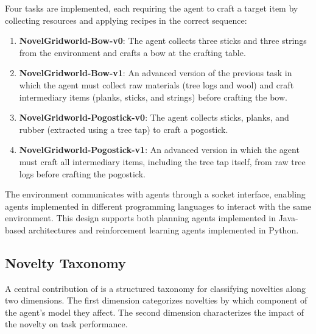 Four tasks are implemented, each requiring the agent to craft a target item by collecting resources and applying recipes in the correct sequence:
\begin{enumerate}[leftmargin=*]
    \item \textbf{NovelGridworld-Bow-v0}: The agent collects three sticks and three strings from the environment and crafts a bow at the crafting table.
    \item \textbf{NovelGridworld-Bow-v1}: An advanced version of the previous task in which the agent must collect raw materials (tree logs and wool) and craft intermediary items (planks, sticks, and strings) before crafting the bow.
    \item \textbf{NovelGridworld-Pogostick-v0}: The agent collects sticks, planks, and rubber (extracted using a tree tap) to craft a pogostick.
    \item \textbf{NovelGridworld-Pogostick-v1}: An advanced version in which the agent must craft all intermediary items, including the tree tap itself, from raw tree logs before crafting the pogostick.
\end{enumerate}




The environment communicates with agents through a socket interface, enabling agents implemented in different programming languages to interact with the same environment. This design supports both planning agents implemented in Java-based architectures and reinforcement learning agents implemented in Python.


\subsection{Novelty Taxonomy}
\label{sec:ngw_novelty_taxonomy}

A central contribution of \NovelGridworlds{} is a structured taxonomy for classifying novelties along two dimensions. The first dimension categorizes novelties by which component of the agent's model they affect. The second dimension characterizes the impact of the novelty on task performance.

